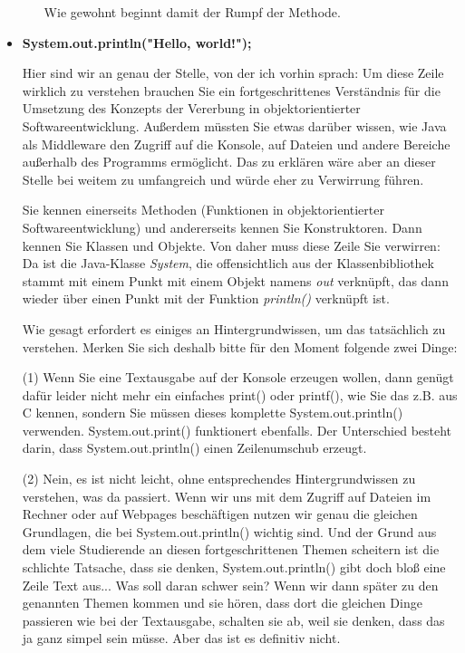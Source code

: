 \begin{itemize}
\begin{itemize}
		Wie gewohnt beginnt damit der Rumpf der Methode.
	\end{itemize}
	
	\item \textbf{System.out.println("Hello, world!");}
	
	Hier sind wir an genau der Stelle, von der ich vorhin sprach: Um diese Zeile wirklich zu verstehen brauchen Sie ein fortgeschrittenes Verständnis für die Umsetzung des Konzepts der Vererbung in objektorientierter Softwareentwicklung. Außerdem müssten Sie etwas darüber wissen, wie Java als Middleware den Zugriff auf die Konsole, auf Dateien und andere Bereiche außerhalb des Programms ermöglicht. Das zu erklären wäre aber an dieser Stelle bei weitem zu umfangreich und würde eher zu Verwirrung führen.
	
	Sie kennen einerseits Methoden (Funktionen in objektorientierter Softwareentwicklung) und andererseits kennen Sie Konstruktoren. Dann kennen Sie Klassen und Objekte. Von daher muss diese Zeile Sie verwirren: Da ist die Java-Klasse \emph{System}, die offensichtlich aus der Klassenbibliothek stammt mit einem Punkt mit einem Objekt namens \emph{out} verknüpft, das dann wieder über einen Punkt mit der Funktion \emph{println()} verknüpft ist.
	
	Wie gesagt erfordert es einiges an Hintergrundwissen, um das tatsächlich zu verstehen. Merken Sie sich deshalb bitte für den Moment folgende zwei Dinge:
	
	(1) Wenn Sie eine Textausgabe auf der Konsole erzeugen wollen, dann genügt dafür leider nicht mehr ein einfaches print() oder printf(), wie Sie das z.B. aus C kennen, sondern Sie müssen dieses komplette System.out.println() verwenden. System.out.print() funktionert ebenfalls. Der Unterschied besteht darin, dass System.out.println() einen Zeilenumschub erzeugt.
	
	(2) Nein, es ist nicht leicht, ohne entsprechendes Hintergrundwissen zu verstehen, was da passiert. Wenn wir uns mit dem Zugriff auf Dateien im Rechner oder auf Webpages beschäftigen nutzen wir genau die gleichen Grundlagen, die bei System.out.println() wichtig sind. Und der Grund aus dem viele Studierende an diesen fortgeschrittenen Themen scheitern ist die schlichte Tatsache, dass sie denken, System.out.println() \glqq{}gibt doch bloß eine Zeile Text aus... Was soll daran schwer sein?\grqq{} Wenn wir dann später zu den genannten Themen kommen und sie hören, dass dort die gleichen \glqq{}Dinge\grqq{} passieren wie bei der Textausgabe, schalten sie ab, weil sie denken, dass das ja ganz simpel sein müsse. Aber das ist es definitiv nicht.
\end{itemize}

